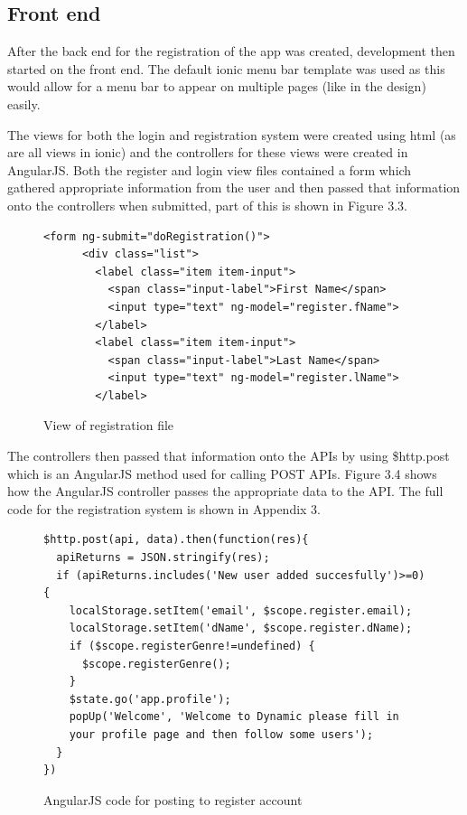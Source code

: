 \subsection{Front end}
After the back end for the registration of the app was created, development then started on the front end. The default ionic menu bar template was used as this would allow for a menu bar to appear on multiple pages (like in the design) easily.

The views for both the login and registration system were created using html (as are all views in ionic) and the controllers for these views were created in AngularJS. Both the register and login view files contained a form which gathered appropriate information from the user and then passed that information onto the controllers when submitted, part of this is shown in Figure 3.3.

\begin{center}
\begin{figure}[H]
\begin{verbatim}
<form ng-submit="doRegistration()">
      <div class="list">
        <label class="item item-input">
          <span class="input-label">First Name</span>
          <input type="text" ng-model="register.fName">
        </label>
        <label class="item item-input">
          <span class="input-label">Last Name</span>
          <input type="text" ng-model="register.lName">
        </label>
\end{verbatim}
\caption{View of registration file}
\end{figure}
\end{center}

The controllers then passed that information onto the APIs by using \$http.post which is an AngularJS method used for calling POST APIs. Figure 3.4 shows how the AngularJS controller passes the appropriate data to the API. The full code for the registration system is shown in Appendix 3.
\begin{center}
\begin{figure}[H]
\begin{verbatim}
$http.post(api, data).then(function(res){
  apiReturns = JSON.stringify(res);
  if (apiReturns.includes('New user added succesfully')>=0) {
    localStorage.setItem('email', $scope.register.email);
    localStorage.setItem('dName', $scope.register.dName);
    if ($scope.registerGenre!=undefined) {
      $scope.registerGenre();
    }
    $state.go('app.profile');
    popUp('Welcome', 'Welcome to Dynamic please fill in 
    your profile page and then follow some users');
  }
})
\end{verbatim}
\caption{AngularJS code for posting to register account}
\end{figure}
\end{center}

